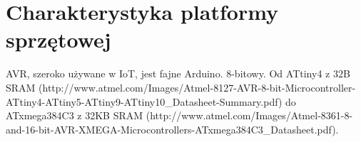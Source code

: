 \chapter{Charakterystyka platformy sprzętowej}

AVR, szeroko używane w IoT, jest fajne Arduino. 8-bitowy. Od ATtiny4 z 32B SRAM (http://www.atmel.com/Images/Atmel-8127-AVR-8-bit-Microcontroller-ATtiny4-ATtiny5-ATtiny9-ATtiny10_Datasheet-Summary.pdf) do ATxmega384C3 z 32KB SRAM (http://www.atmel.com/Images/Atmel-8361-8-and-16-bit-AVR-XMEGA-Microcontrollers-ATxmega384C3_Datasheet.pdf). 
